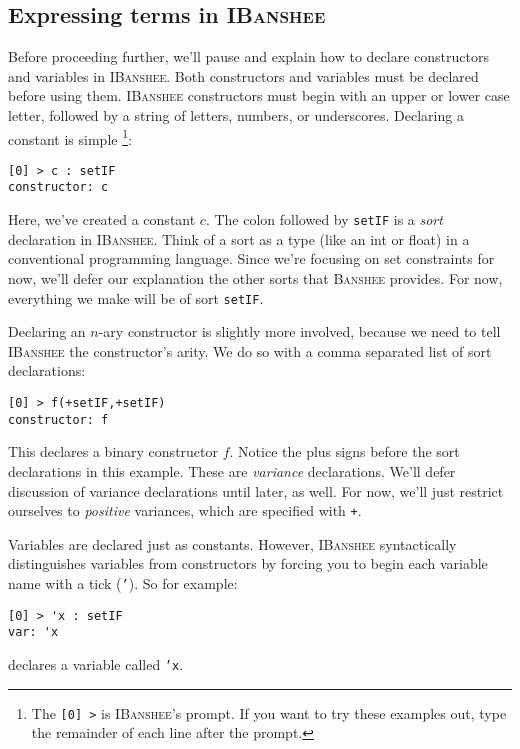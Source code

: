 \documentclass{article}
\newcommand{\banshee}{\textsc{Banshee}}
\newcommand{\ibanshee}{\textsc{IBanshee}}
\begin{document}
\subsection{Expressing terms in \ibanshee{}}

Before proceeding further, we'll pause and explain how to declare
constructors and variables in \ibanshee{}. Both constructors and
variables must be declared before using them. \ibanshee{} constructors
must begin with an upper or lower case letter, followed by a string of
letters, numbers, or underscores. Declaring a constant is
simple \footnote{The \texttt{[0] >} is \ibanshee{}'s prompt. If you
  want to try these examples out, type the remainder of each line
  after the prompt.}:

\begin{verbatim}
[0] > c : setIF
constructor: c
\end{verbatim}
Here, we've created a constant $c$. The colon followed by
\texttt{setIF} is a \emph{sort} declaration in \ibanshee{}. Think of a
sort as a type (like an int or float) in a conventional programming
language. Since we're focusing on set constraints for now, we'll defer
our explanation the other sorts that \banshee{} provides. For now,
everything we make will be of sort \texttt{setIF}.

Declaring an $n$-ary constructor is slightly more involved, because we
need to tell \ibanshee{} the constructor's arity. We do so with a
comma separated list of sort declarations:

\begin{verbatim}
[0] > f(+setIF,+setIF)
constructor: f
\end{verbatim}

This declares a binary constructor $f$. Notice the plus signs before
the sort declarations in this example. These are \emph{variance}
declarations. We'll defer discussion of variance declarations until
later, as well. For now, we'll just restrict ourselves to
\emph{positive} variances, which are specified with \texttt{+}.

Variables are declared just as constants. However, \ibanshee{}
syntactically distinguishes variables from constructors by forcing you
to begin each variable name with a tick (\texttt{'}). So for example:

\begin{verbatim}
[0] > 'x : setIF
var: 'x
\end{verbatim}

declares a variable called \texttt{'x}.
\end{document}
